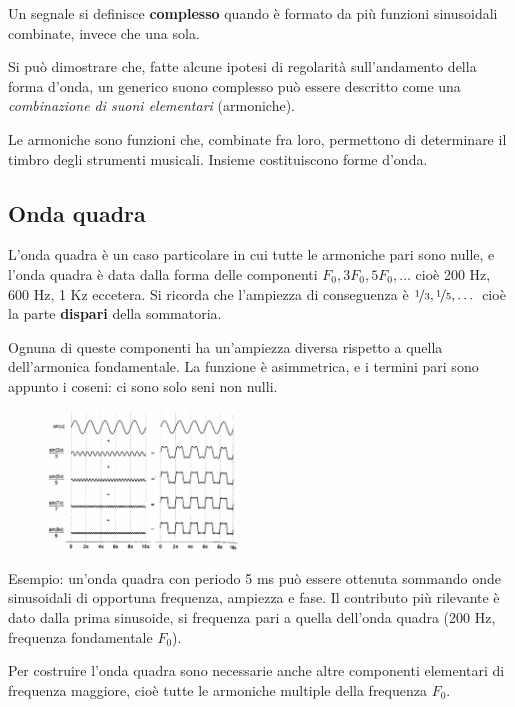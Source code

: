 Un segnale si definisce \textbf{complesso} quando è formato da più funzioni sinusoidali combinate, invece che una sola.

Si può dimostrare che, fatte alcune ipotesi di regolarità sull'andamento della forma d'onda, un generico suono complesso può essere descritto come una \textit{combinazione di suoni elementari} (armoniche).

Le armoniche sono funzioni che, combinate fra loro, permettono di determinare il timbro degli strumenti musicali. Insieme costituiscono forme d'onda. 

\subsection{Onda quadra}
L'onda quadra è un caso particolare in cui tutte le armoniche pari sono nulle, e l'onda quadra è data dalla forma delle componenti $F_0, 3F_0, 5F_0, \dots$ cioè 200 Hz, 600 Hz, 1 Kz eccetera. Si ricorda che l'ampiezza di conseguenza è $\nicefrac{1}{3}, \nicefrac{1}{5}, \dots$ cioè la parte \textbf{dispari} della sommatoria.

Ognuna di queste componenti ha un'ampiezza diversa rispetto a quella dell'armonica fondamentale. La funzione è asimmetrica, e i termini pari sono appunto i coseni: ci sono solo seni non nulli. 

\begin{figure}
	\vspace{-5pt}
	\includegraphics[width=0.45\textwidth]{Lezioni/Immagini/ondaquadra}
	\vspace{-25pt}
\end{figure}

Esempio: un'onda quadra con periodo 5 ms può essere ottenuta sommando onde sinusoidali di opportuna frequenza, ampiezza e fase. Il contributo più rilevante è dato dalla prima sinusoide, si frequenza pari a quella dell'onda quadra (200 Hz, frequenza fondamentale $F_0$).

Per costruire l'onda quadra sono necessarie anche altre componenti elementari di frequenza maggiore, cioè tutte le armoniche multiple della frequenza $F_0$. \\

